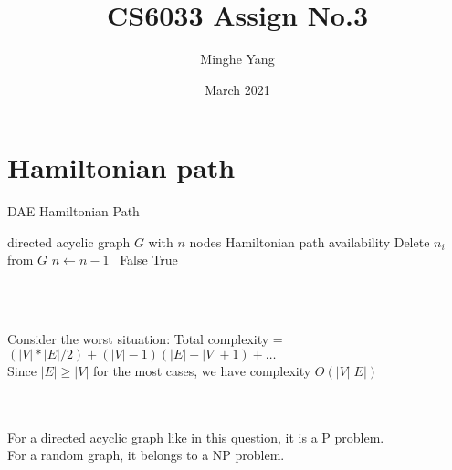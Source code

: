\documentclass{article}
\title{CS6033 Assign No.3}
\author{Minghe Yang }
\date{March 2021}
\begin{document}
\renewcommand{\algorithmicrequire}{\textbf{Input:}} 
\renewcommand{\algorithmicensure}{\textbf{Output:}}
\maketitle

\section{Hamiltonian path}
\begin{algorithm}
    \caption{DAE Hamiltonian Path}
    \begin{algorithmic}[1]
    \Require directed acyclic graph $G$ with $n$ nodes
    \Ensure Hamiltonian path availability 
                \State Delete $n_i$ from $G$
                \State $n \gets n-1$
                \Else \ \Return False
            \EndIf
        \EndFor
    \EndWhile
    \State \Return True
    \end{algorithmic}
\end{algorithm}
\\\\
Consider the worst situation:
Total complexity =$(|V|*|E|/2)+(|V|-1)(|E|-|V|+1)+\dots $
\\Since $|E| \geq |V|$ for the most cases, we have complexity $O(|V||E|)$
\\\\
\\For a directed acyclic graph like in this question, it is a P problem.
\\For a random graph, it belongs to a NP problem. 
\\
\end{document}
